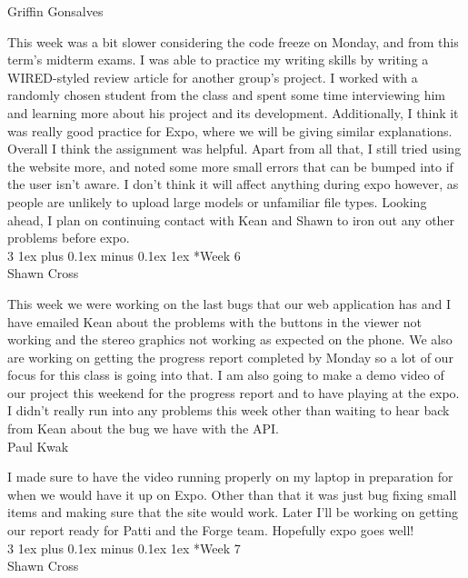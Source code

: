 \documentclass[letterpaper, 10pt, draftclsnofoot, compsoc, onecolumn]{IEEEtran}
\makeatletter
\def\subsubsection{\@startsection{subsubsection}%
                                 {3}%
                                 {\z@}%
                                 {1ex plus 0.1ex minus 0.1ex}%
                                 {1ex}%
                                 {\normalfont\normalsize}}%
\makeatother
\begin{document}
Griffin Gonsalves

This week was a bit slower considering the code freeze on Monday, and from this term's midterm exams. I was able to practice my writing skills by writing a WIRED-styled review article for another group's project. I worked with a randomly chosen student from the class and spent some time interviewing him and learning more about his project and its development. Additionally, I think it was really good practice for Expo, where we will be giving similar explanations. Overall I think the assignment was helpful. Apart from all that, I still tried using the website more, and noted some more small errors that can be bumped into if the user isn't aware. I don't think it will affect anything during expo however, as people are unlikely to upload large models or unfamiliar file types. Looking ahead, I plan on continuing contact with Kean and Shawn to iron out any other problems before expo.\\

\subsubsection*{Week 6}\hspace*{\fill} \\
Shawn Cross

This week we were working on the last bugs that our web application has and I have emailed Kean about the problems with the buttons in the viewer not working and the stereo graphics not working as expected on the phone. We also are working on getting the progress report completed by Monday so a lot of our focus for this class is going into that. I am also going to make a demo video of our project this weekend for the progress report and to have playing at the expo. I didn't really run into any problems this week other than waiting to hear back from Kean about the bug we have with the API.\\

Paul Kwak

I made sure to have the video running properly on my laptop in preparation for when we would have it up on Expo. Other than that it was just bug fixing small items and making sure that the site would work. Later I'll be working on getting our report ready for Patti and the Forge team. Hopefully expo goes well!\\
\subsubsection*{Week 7}\hspace*{\fill} \\ 
Shawn Cross
\end{document}
